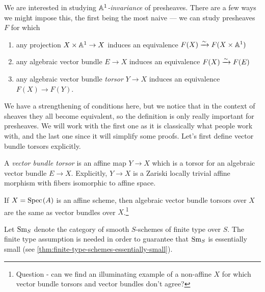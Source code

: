 \documentclass[11pt,openany]{book}
\begin{document}
We are interested in studying \textit{$\mathbb{A}^1$-invariance} of presheaves. There are a few ways we might impose this, the first being the most naive --- we can study presheaves $F$ for which
\begin{enumerate}
    \item any projection $X \times \mathbb{A}^1 \to X$ induces an equivalence $F(X) \xrightarrow{\sim} F(X \times \mathbb{A}^1)$
    \item any algebraic vector bundle $E \to X$ induces an equivalence $F(X) \xrightarrow{\sim} F(E)$
    \item any algebraic vector bundle \textit{torsor} $Y \to X$ induces an equivalence $F(X) \to F(Y)$.
\end{enumerate}
We have a strengthening of conditions here, but we notice that in the context of sheaves they all become equivalent, so the definition is only really important for presheaves. We will work with the first one as it is classically what people work with, and the last one since it will simplify some proofs. Let's first define vector bundle torsors explicitly.

\begin{definition} \cite[4.2]{Weibel-KH}
A \textit{vector bundle torsor} is an affine map $Y \to X$ which is a torsor for an algebraic vector bundle $E \to X$. Explicitly, $Y \to X$ is a Zariski locally trivial affine morphism with fibers isomorphic to affine space.
\end{definition}

\begin{example} If $X = \text{Spec}\hspace{0.1em}(A)$ is an affine scheme, then algebraic vector bundle torsors over $X$ are the same as vector bundles over $X$.\footnote{%
Question - can we find an illuminating example of a non-affine $X$ for which vector bundle torsors and vector bundles don't agree?}
\end{example}


\begin{notation} Let $\mathrm{Sm}_S$ denote the category of smooth $S$-schemes of finite type over $S$. The finite type assumption is needed in order to guarantee that $\mathrm{Sm}_S$ is essentially small (see \autoref{thm:finite-type-schemes-essentially-small}).
\end{notation}
\end{document}
